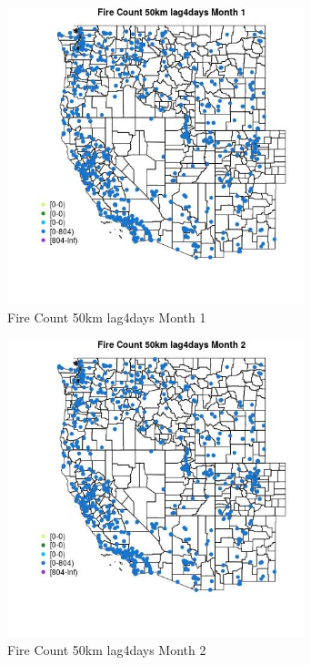 \begin{figure} 
\centering  
\includegraphics[width=0.77\textwidth]{Code_Outputs/Report_ML_input_PM25_Step4_part_f_de_duplicated_aves_prioritize_24hr_obswNAs_MapObsMo1Fire_Count_50km_lag4days.jpg} 
\caption{\label{fig:Report_ML_input_PM25_Step4_part_f_de_duplicated_aves_prioritize_24hr_obswNAsMapObsMo1Fire_Count_50km_lag4days}Fire Count 50km lag4days Month 1} 
\end{figure} 
 

\begin{figure} 
\centering  
\includegraphics[width=0.77\textwidth]{Code_Outputs/Report_ML_input_PM25_Step4_part_f_de_duplicated_aves_prioritize_24hr_obswNAs_MapObsMo2Fire_Count_50km_lag4days.jpg} 
\caption{\label{fig:Report_ML_input_PM25_Step4_part_f_de_duplicated_aves_prioritize_24hr_obswNAsMapObsMo2Fire_Count_50km_lag4days}Fire Count 50km lag4days Month 2} 
\end{figure} 
 

